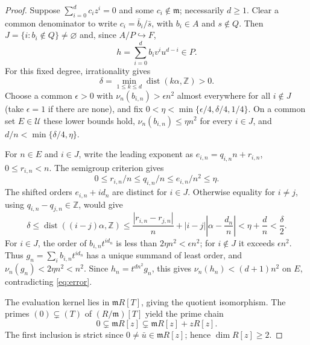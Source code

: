 \documentclass[10pt,a4paper]{amsart}
\newcommand{\UU}{\mathcal U}
\DeclareMathOperator{\dist}{dist}
\newcommand{\mm}{\mathfrak m}
\begin{document}
\begin{proof}
Suppose $\sum_{i=0}^d c_i z^i=0$ and some $c_i\notin\mm$;
necessarily $d\geq1$. Clear a common denominator to write
$c_i=\bar b_i/\bar s$, with $b_i\in A$ and $s\notin Q$.
Then $J=\{i:b_i\notin Q\}\ne\varnothing$ and, since
$A/P\hookrightarrow F$,
\begin{equation}\label{eq:error}
 h=\sum_{i=0}^d b_i v^i u^{d-i}\in P.
\end{equation}
For this fixed degree, irrationality gives
\[
 \delta=\min_{1\leq k\leq d}\dist(k\alpha,\mathbb Z)>0.
\]
Choose a common $\epsilon>0$ with
$\nu_n(b_{i,n})>\epsilon n^2$ almost everywhere for all $i\notin J$
(take $\epsilon=1$ if there are none), and fix
$0<\eta<\min\{\epsilon/4,\delta/4,1/4\}$.
On a common set $E\in\UU$ these lower bounds hold,
$\nu_n(b_{i,n})\leq\eta n^2$ for every $i\in J$, and
$d/n<\min\{\delta/4,\eta\}$.

For $n\in E$ and $i\in J$, write the leading exponent as
$e_{i,n}=q_{i,n}n+r_{i,n}$, $0\leq r_{i,n}<n$.
The semigroup criterion gives
\[
 0\leq r_{i,n}/n\leq q_{i,n}/n\leq e_{i,n}/n^2\leq\eta.
\]
The shifted orders $e_{i,n}+id_n$ are distinct for $i\in J$.
Otherwise equality for $i\ne j$, using
$q_{i,n}-q_{j,n}\in\mathbb Z$, would give
\[
 \delta\leq\dist((i-j)\alpha,\mathbb Z)
 \leq\frac{|r_{i,n}-r_{j,n}|}{n}
      +|i-j|\left|\alpha-\frac{d_n}{n}\right|
 <\eta+\frac dn<\frac\delta2.
\]
For $i\in J$, the order of $b_{i,n}t^{id_n}$ is less than
$2\eta n^2<\epsilon n^2$; for $i\notin J$ it exceeds
$\epsilon n^2$. Thus $g_n=\sum_i b_{i,n}t^{id_n}$ has a unique
summand of least order, and $\nu_n(g_n)<2\eta n^2<n^2$.
Since $h_n=t^{dn^2}g_n$, this gives
$\nu_n(h_n)<(d+1)n^2$ on $E$, contradicting \eqref{eq:error}.

The evaluation kernel lies in $\mm R[T]$, giving the quotient
isomorphism. The primes $(0)\subsetneq(T)$ of $(R/\mm)[T]$ yield
the prime chain
\[
 0\subsetneq\mm R[z]\subsetneq\mm R[z]+zR[z].
\]
The first inclusion is strict since $0\ne\bar u\in\mm R[z]$;
hence $\dim R[z]\geq2$.
\end{proof}
\end{document}
